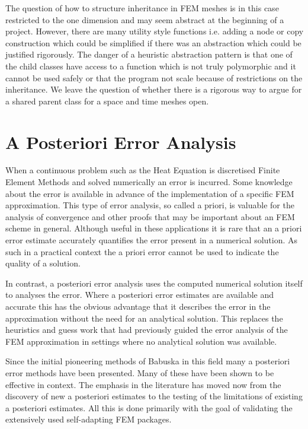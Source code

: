 \documentclass{uonmathreport}
\theoremstyle{definition}
\theoremstyle{problem}
\theoremstyle{theorem}
\begin{document}
The question of how to structure inheritance in FEM meshes is in this case restricted to the one dimension and may seem abstract at the beginning of a project. However, there are many utility style functions i.e. adding a node or copy construction which could be simplified if there was an abstraction which could be justified rigorously. The danger of a heuristic abstraction pattern is that one of the child classes have access to a function which is not truly polymorphic and it cannot be used safely or that the program not scale because of restrictions on the inheritance. We leave the question of whether there is a rigorous way to argue for a shared parent class for a space and time meshes open. 

\newpage

\section{A Posteriori Error Analysis} \label{sec:Errors}

When a continuous problem such as the Heat Equation is discretised Finite Element Methods and solved numerically an error is incurred. Some knowledge about the error is available in advance of the implementation of a specific FEM approximation. This type of error analysis, so called a priori, is valuable for the analysis of convergence and other proofs that may be important about an FEM scheme in general. Although useful in these applications it is rare that an a priori error estimate accurately quantifies the error present in a numerical solution. As such in a practical context the a priori error cannot be used to indicate the quality of a solution. 

In contrast, a posteriori error analysis uses the computed numerical solution itself to analyses the error. Where a posteriori error estimates are available and accurate this has the obvious advantage that it describes the error in the approximation without the need for an analytical solution. This replaces the heuristics and guess work that had previously guided the error analysis of the FEM approximation in settings where no analytical solution was available. 

Since the initial pioneering methods of Babuska \cite{babuska1978posteriori} \cite{babuska1981posteriori} in this field many a posteriori error methods have been presented. Many of these have been shown to be effective in context. The emphasis in the literature has moved now from the discovery of new a posteriori estimates to the testing of the limitations of existing a posteriori estimates. All this is done primarily with the goal of validating the extensively used self-adapting FEM packages.
\end{document}

